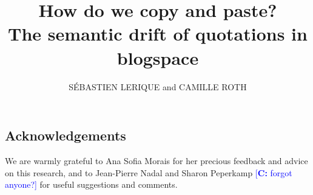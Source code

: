 \documentclass{acmtog}
\title{{How do we copy and paste?\\The semantic drift of quotations in blogspace}}
\date{}
\author{S\'EBASTIEN LERIQUE {\upshape and} CAMILLE ROTH}
\newcommand{\cam}[1]{\textcolor{blue}{\small{[{\bf C:} }#1{]}}}
\begin{document}
\maketitle







\subsection*{Acknowledgements}

We are warmly grateful to Ana Sofia Morais for her precious feedback and advice on this research, and to Jean-Pierre Nadal and Sharon Peperkamp \cam{forgot anyone?} for useful suggestions and comments.




\clearpage 

\end{document}
